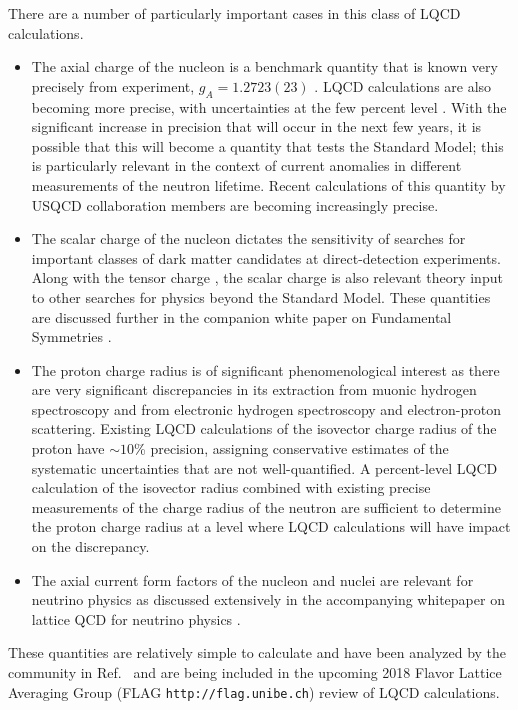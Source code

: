 There are a number of particularly important cases in this class of LQCD calculations. 
\begin{itemize}
	\item The axial charge of the nucleon is a benchmark quantity that is known very precisely from experiment, $g_A=1.2723(23)$ \cite{Patrignani:2016xqp}. LQCD calculations are also becoming more precise, with uncertainties at the few percent level  \cite{Bhattacharya:2016zcn,Yoon:2016jzj,Chang:2018uxx,Gupta:2018qil}. With the significant increase in precision that will occur in the next few years, it is possible that this will  become a quantity that tests the Standard Model; this is particularly relevant in the context of current anomalies in different measurements of the neutron lifetime. Recent calculations of this quantity by USQCD collaboration members are becoming increasingly precise.
	
	\item The scalar charge of the nucleon dictates the sensitivity of searches for important classes of dark matter candidates at direct-detection experiments. Along with the tensor charge \cite{Gupta:2018lvp}, the scalar charge \cite{Shanahan:2016pla}  is also relevant theory input to other searches for physics beyond the Standard Model. These quantities are discussed further in the companion white paper on Fundamental Symmetries \cite{Davoudi:2018qcd}.
	
	\item The proton charge radius is  of significant phenomenological interest as there are very significant discrepancies in its extraction from muonic hydrogen spectroscopy  and from electronic hydrogen spectroscopy and electron-proton scattering. Existing LQCD calculations of the isovector charge radius of the proton \cite{Capitani:2015sba, Hasan:2017wwt,Alexandrou:2017ypw,Ishikawa:2018rew,Detmold:2018ptb,Alexandrou:2018sjm}  have $\sim10$\% precision, assigning conservative estimates of the systematic uncertainties that are not well-quantified. A  percent-level  LQCD calculation of the isovector radius combined with existing precise measurements of the charge radius of the neutron are sufficient to determine the proton charge radius at a level where LQCD calculations will  have impact on the discrepancy. 
	
	\item The axial current form factors of the nucleon and nuclei are relevant for neutrino physics as discussed extensively in the  accompanying whitepaper on lattice QCD for neutrino physics \cite{Kronfeld:2018qcd}.
\end{itemize} 
These quantities are relatively simple to calculate  and have been analyzed by the community in Ref.~\cite{Lin:2017snn} and  are being included in the upcoming 2018 Flavor Lattice Averaging Group (FLAG {\tt http://flag.unibe.ch})
review of LQCD calculations.

